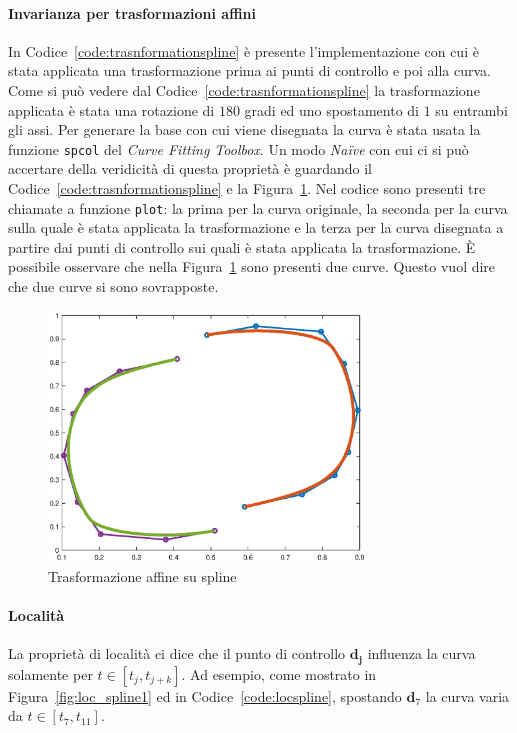 \documentclass[a4paper, 12pt]{article}
\begin{document}
\paragraph{Invarianza per trasformazioni affini} In Codice~\ref{code:trasnformationspline} è 
presente l'implementazione con cui è stata applicata una trasformazione
prima ai punti di controllo e poi alla curva. Come si può vedere dal 
Codice~\ref{code:trasnformationspline} la 
trasformazione applicata è stata una rotazione di $180$ gradi
ed uno spostamento di $1$ su entrambi gli assi. Per generare la base con cui viene disegnata la curva 
è stata usata la funzione \texttt{spcol} del \textit{Curve Fitting Toolbox}.
Un modo \textit{Naïve} con cui ci si può accertare della veridicità di questa proprietà è 
guardando il Codice~\ref{code:trasnformationspline} e la Figura~\ref{fig:trasformationspline}. Nel codice sono presenti 
tre chiamate a funzione \texttt{plot}: la prima per la curva originale, la seconda per la curva sulla quale è
stata applicata la trasformazione e la terza per la curva disegnata a partire dai punti di controllo
sui quali è stata applicata la trasformazione. È possibile osservare che nella Figura~\ref{fig:trasformationspline} sono presenti due curve. 
Questo vuol dire che due curve si sono sovrapposte.
\begin{figure}[]
  \centering
  \includegraphics[width=0.75\textwidth]{figure/transformation_spline.eps}
  \caption{Trasformazione affine su spline}
  \label{fig:trasformationspline}
\end{figure} 




\paragraph{Località} La proprietà di località ci dice  che il punto di controllo $\mathbf{d_j}$ influenza la curva solamente per $t \in [t_j, t_{j+k}]$. 
Ad esempio, come mostrato in Figura~\ref{fig:loc_spline1} ed in Codice~\ref{code:locspline}, spostando $\mathbf{d}_7$ la curva varia da $t \in [t_7, t_{11}]$. 
\end{document}
